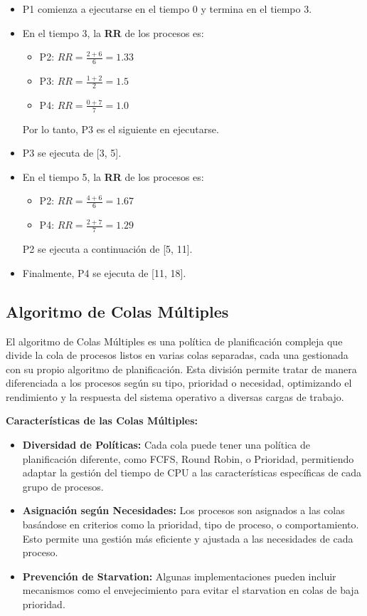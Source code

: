 \begin{itemize}
	\item P1 comienza a ejecutarse en el tiempo 0 y termina en el tiempo 3.
	\item En el tiempo 3, la \textbf{RR} de los procesos es:
	\begin{itemize}
		\item P2: \( RR = \frac{2 + 6}{6} = 1.33 \)
		\item P3: \( RR = \frac{1 + 2}{2} = 1.5 \)
		\item P4: \( RR = \frac{0 + 7}{7} = 1.0 \)
	\end{itemize}
	Por lo tanto, P3 es el siguiente en ejecutarse.
	\item P3 se ejecuta de [3, 5].
	\item En el tiempo 5, la \textbf{RR} de los procesos es:
	\begin{itemize}
		\item P2: \( RR = \frac{4 + 6}{6} = 1.67 \)
		\item P4: \( RR = \frac{2 + 7}{7} = 1.29 \)
	\end{itemize}
	P2 se ejecuta a continuación de [5, 11].
	\item Finalmente, P4 se ejecuta de [11, 18].
\end{itemize}


\subsection{Algoritmo de Colas Múltiples}

El algoritmo de Colas Múltiples es una política de planificación compleja que divide la cola de procesos listos en varias colas separadas, cada una gestionada con su propio algoritmo de planificación. Esta división permite tratar de manera diferenciada a los procesos según su tipo, prioridad o necesidad, optimizando el rendimiento y la respuesta del sistema operativo a diversas cargas de trabajo.

\textbf{Características de las Colas Múltiples:}
\begin{itemize}
	\item \textbf{Diversidad de Políticas:} Cada cola puede tener una política de planificación diferente, como FCFS, Round Robin, o Prioridad, permitiendo adaptar la gestión del tiempo de CPU a las características específicas de cada grupo de procesos.
	\item \textbf{Asignación según Necesidades:} Los procesos son asignados a las colas basándose en criterios como la prioridad, tipo de proceso, o comportamiento. Esto permite una gestión más eficiente y ajustada a las necesidades de cada proceso.
	\item \textbf{Prevención de Starvation:} Algunas implementaciones pueden incluir mecanismos como el envejecimiento para evitar el starvation en colas de baja prioridad.
\end{itemize}


